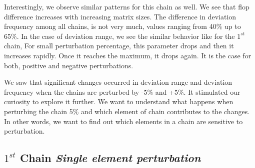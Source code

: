 \documentclass[10pts]{article}
\begin{document}
    \vspace*{4pt}     	
         	 Interestingly, we observe similar patterns for this chain as well. We see that flop difference increases with increasing matrix sizes. The difference in deviation frequency among all chains, is not very much, values ranging from 40\% up to 65\%. In the case of deviation range, we see the similar behavior like for the $1^{st}$ chain,  For small perturbation percentage, this parameter drops and then it increases rapidly. Once it reaches the maximum, it drops again. It is the case for both, positive and negative perturbations.

  We saw that significant changes occurred in deviation range and deviation frequency when the chains are perturbed by -5\% and +5\%. It stimulated our curiosity to explore it further. We want to understand what happens when perturbing the chain 5\% and which element of chain contributes to the changes. In other words, we want to find out which elements in a chain are sensitive to perturbation.

\subsection*{$1^{st}$ Chain \hspace{8pt} \textit{Single element perturbation}}
      
\end{document}
